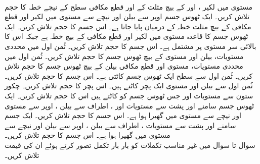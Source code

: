 \\
مستوی  میں لکیر ،  اور  کے بیچ مثلث کے اور  قطع مکافی سطح   کے نیچے  خطہ کا حجم تلاش کریں۔
ایک ٹھوس جسم  اوپر سے بیلن  اور نیچے سے مستوی  میں لکیر  اور قطع مکافی   کے بیچ مثلث   خطہ کے درمیان پایا جاتا ہے۔ اس جسم  کا حجم تلاش کریں۔
ایک ٹھوس جسم  کا قاعدہ مستوی  میں  لکیر  اور قطع مکافی  کے بیچ خطہ ہے جبکہ اس کا بالائی سر مستوی  پر مشتمل ہے۔  اس جسم کا حجم تلاش کریں۔
ثُمن  اول میں  محددی مستویات،  بیلن  اور مستوی  کے بیچ ٹھوس جسم کا حجم تلاش کریں۔ 
ثُمن اول میں  محددی مستویات، مستوی   اور قطع مکافی بیلن  کے بیچ ٹھوس جسم کا حجم تلاش کریں۔
ثُمن اول سے  سطح  ایک ٹھوس جسم کاٹتی ہے۔ اس جسم کا حجم تلاش کریں۔
ثُمن اول سے بیلن  اور مستوی   ایک  پچر کاٹتے ہیں۔ اس پچر کا حجم تلاش کریں۔
چکور ستون    سے مستویات   اور   جس ٹھوس جسم کو کاٹتے ہیں اس کا حجم تلاش کریں۔
ایک ٹھوس جسم  سامنے اور پشت سے  مستویات  اور ،  اطراف سے بیلن ، اوپر سے مستوی  اور نیچے سے مستوی  میں گھیرا ہوا ہے۔ اس جسم کا حجم تلاش کریں۔
ایک جسم سامنے اور پشت سے مستویات ، اطراف سے بیلن  ، اوپر سے بیلن  اور نیچے سے مستوی  میں گھیرا ہوا ہے۔ اس جسم کا حجم تلاش کریں۔
\\
سوال  تا سوال  میں غیر مناسب تکملات کو بار بار تکمل تصور کرتے ہوئے ان  کی قیمت تلاش کریں۔

